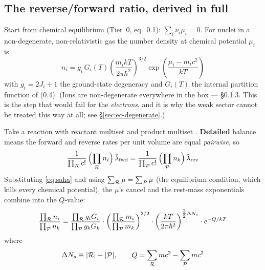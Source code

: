 \subsection{The reverse/forward ratio, derived in full}
\label{sec:db-ratio}

Start from chemical equilibrium (Tier~0, eq.~0.1): $\sum_i \nu_i\mu_i = 0$. For
nuclei in a non-degenerate, non-relativistic gas the number density at chemical
potential $\mu_i$ is \citep{hix1999b}
%
\begin{equation}
n_i = g_i\,G_i(T)\left(\frac{m_i kT}{2\pi\hbar^2}\right)^{3/2}
      \exp\!\left(\frac{\mu_i - m_i c^2}{kT}\right)
\label{eq:saha}
\end{equation}
%
with $g_i = 2J_i+1$ the ground-state degeneracy and $G_i(T)$ the internal
partition function of (0.4). (Ions are non-degenerate everywhere in the box ---
\S0.1.3. This is the step that would fail for the \emph{electrons}, and it is
why the weak sector cannot be treated this way at all; see
\S\ref{sec:ec-degenerate}.)

Take a reaction with reactant multiset \Rset{} and product multiset \Pset.
\textbf{Detailed} balance means the forward and reverse rates per unit volume
are equal \emph{pairwise}, so
%
\begin{equation}
\frac{1}{\prod_{\mathcal{R}} c!}\,\Bigl(\prod_{\mathcal{R}} n_i\Bigr)\,
\tilde\lambda_{\rm fwd}
=
\frac{1}{\prod_{\mathcal{P}} c!}\,\Bigl(\prod_{\mathcal{P}} n_k\Bigr)\,
\tilde\lambda_{\rm rev}
\label{eq:dbbalance}
\end{equation}
%
Substituting \eqref{eq:saha} and using
$\sum_{\mathcal{R}}\mu = \sum_{\mathcal{P}}\mu$ (the equilibrium condition, which kills
every chemical potential), the $\mu$'s cancel and the rest-mass exponentials
combine into the $Q$-value:
%
\begin{equation}
\frac{\prod_{\mathcal{R}} n_i}{\prod_{\mathcal{P}} n_k}
=
\frac{\prod_{\mathcal{R}} g_i G_i}{\prod_{\mathcal{P}} g_k G_k}
\cdot
\left(\frac{\prod_{\mathcal{R}} m_i}{\prod_{\mathcal{P}} m_k}\right)^{3/2}
\cdot
\left(\frac{kT}{2\pi\hbar^2}\right)^{\tfrac{3}{2}\Delta N_{s}}
\cdot e^{-Q/kT}
\label{eq:dbdensities}
\end{equation}
%
where
%
\begin{equation*}
\Delta N_{s} \equiv |\mathcal{R}| - |\mathcal{P}|,
\qquad
Q = \sum_{\mathcal{R}} m c^2 - \sum_{\mathcal{P}} m c^2
\end{equation*}

